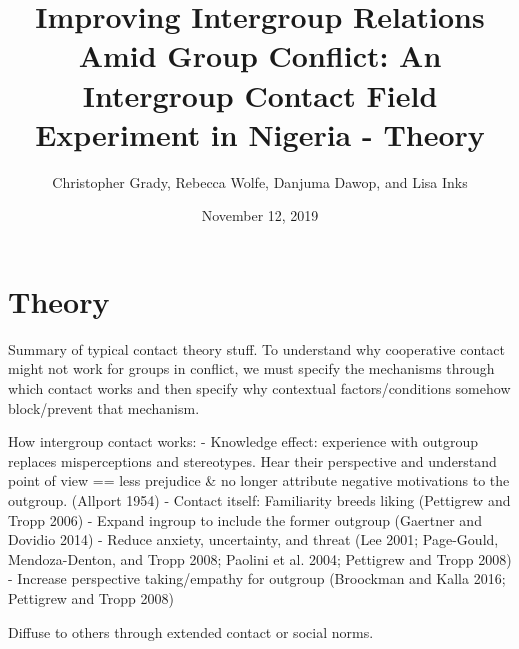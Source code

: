 \documentclass[11pt]{article}
\title{Improving Intergroup Relations Amid Group Conflict: An Intergroup
Contact Field Experiment in Nigeria - Theory}
\author{
Christopher Grady, Rebecca Wolfe, Danjuma Dawop, and Lisa Inks
}
\date{November 12, 2019}
\begin{document}
\VerbatimFootnotes

%
%
%
%
%
%
%
%
%
%

\maketitle

\hypertarget{theory}{%
\section{Theory}\label{theory}}

Summary of typical contact theory stuff. To understand why cooperative
contact might not work for groups in conflict, we must specify the
mechanisms through which contact works and then specify why contextual
factors/conditions somehow block/prevent that mechanism.

How intergroup contact works: - Knowledge effect: experience with
outgroup replaces misperceptions and stereotypes. Hear their perspective
and understand point of view == less prejudice \& no longer attribute
negative motivations to the outgroup. (Allport 1954) - Contact itself:
Familiarity breeds liking (Pettigrew and Tropp 2006) - Expand ingroup to
include the former outgroup (Gaertner and Dovidio 2014) - Reduce
anxiety, uncertainty, and threat (Lee 2001; Page-Gould, Mendoza-Denton,
and Tropp 2008; Paolini et al. 2004; Pettigrew and Tropp 2008) -
Increase perspective taking/empathy for outgroup (Broockman and Kalla
2016; Pettigrew and Tropp 2008)

Diffuse to others through extended contact or social norms.
\end{document}

